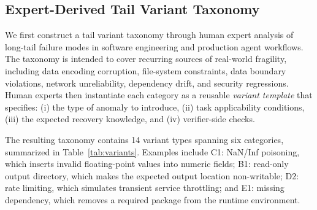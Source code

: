 \documentclass[11pt]{article}
\begin{document}
\subsection{Expert-Derived Tail Variant Taxonomy}

We first construct a tail variant taxonomy through human expert analysis of long-tail failure modes in software engineering and production agent workflows. The taxonomy is intended to cover recurring sources of real-world fragility, including data encoding corruption, file-system constraints, data boundary violations, network unreliability, dependency drift, and security regressions. Human experts then instantiate each category as a reusable \textit{variant template} that specifies: (i) the type of anomaly to introduce, (ii) task applicability conditions, (iii) the expected recovery knowledge, and (iv) verifier-side checks.

The resulting taxonomy contains 14 variant types spanning six categories, summarized in Table~\ref{tab:variants}. Examples include C1: NaN/Inf poisoning, which inserts invalid floating-point values into numeric fields; B1: read-only output directory, which makes the expected output location non-writable; D2: rate limiting, which simulates transient service throttling; and E1: missing dependency, which removes a required package from the runtime environment.
\end{document}
